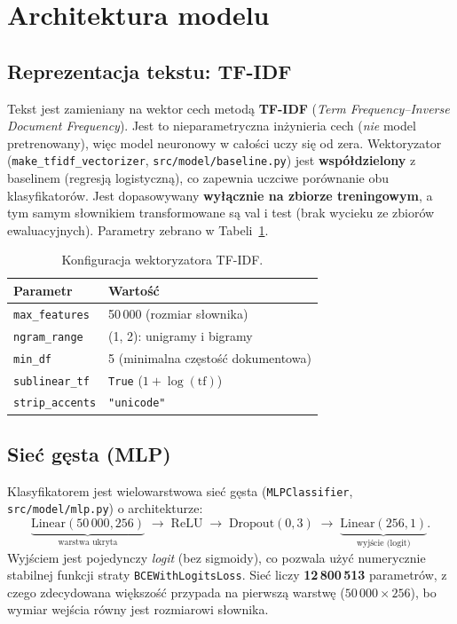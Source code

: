 \section{Architektura modelu}
\label{sec:arch}

\subsection{Reprezentacja tekstu: TF-IDF}

Tekst jest zamieniany na wektor cech metodą \textbf{TF-IDF} (\emph{Term
Frequency--Inverse Document Frequency}). Jest to nieparametryczna inżynieria cech
(\emph{nie} model pretrenowany), więc model neuronowy w całości uczy się od zera.
Wektoryzator (\texttt{make\_tfidf\_vectorizer}, \texttt{src/model/baseline.py}) jest
\textbf{współdzielony} z baselinem (regresją logistyczną), co zapewnia uczciwe
porównanie obu klasyfikatorów. Jest dopasowywany \textbf{wyłącznie na zbiorze
treningowym}, a tym samym słownikiem transformowane są val i test (brak wycieku
ze zbiorów ewaluacyjnych). Parametry zebrano w Tabeli~\ref{tab:tfidf}.

\begin{table}[H]
  \centering
  \caption{Konfiguracja wektoryzatora TF-IDF.}
  \label{tab:tfidf}
  \begin{tabular}{ll}
    \toprule
    \textbf{Parametr} & \textbf{Wartość} \\
    \midrule
    \texttt{max\_features} & 50\,000 (rozmiar słownika) \\
    \texttt{ngram\_range}  & (1, 2): unigramy i bigramy \\
    \texttt{min\_df}       & 5 (minimalna częstość dokumentowa) \\
    \texttt{sublinear\_tf} & \texttt{True} ($1 + \log(\mathrm{tf})$) \\
    \texttt{strip\_accents}& \texttt{"unicode"} \\
    \bottomrule
  \end{tabular}
\end{table}

\subsection{Sieć gęsta (MLP)}

Klasyfikatorem jest wielowarstwowa sieć gęsta (\texttt{MLPClassifier},
\texttt{src/model/mlp.py}) o architekturze:
\[
  \underbrace{\text{Linear}(50\,000, 256)}_{\text{warstwa ukryta}}
  \;\rightarrow\; \text{ReLU}
  \;\rightarrow\; \text{Dropout}(0{,}3)
  \;\rightarrow\; \underbrace{\text{Linear}(256, 1)}_{\text{wyjście (logit)}}.
\]
Wyjściem jest pojedynczy \emph{logit} (bez sigmoidy), co pozwala użyć numerycznie
stabilnej funkcji straty \texttt{BCEWithLogitsLoss}. Sieć liczy
\textbf{12\,800\,513} parametrów, z czego zdecydowana większość przypada na pierwszą
warstwę ($50\,000 \times 256$), bo wymiar wejścia równy jest rozmiarowi słownika.

